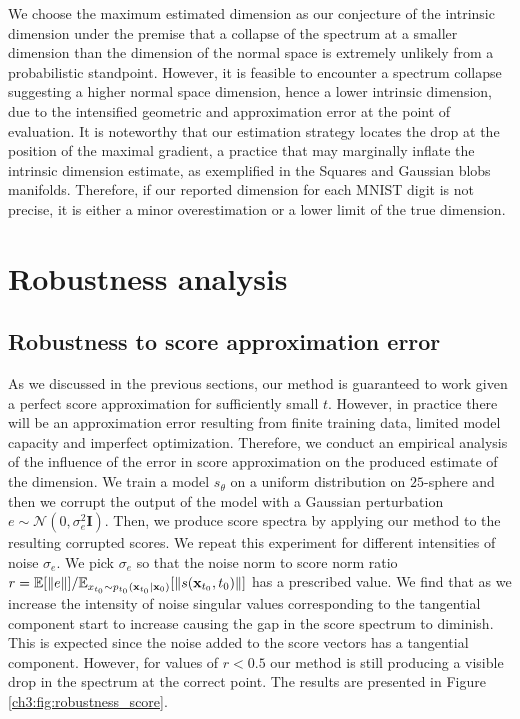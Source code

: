    We choose the maximum estimated dimension as our conjecture of the intrinsic dimension under the premise that a collapse of the spectrum at a smaller dimension than the dimension of the normal space is extremely unlikely from a probabilistic standpoint.  However, it is feasible to encounter a spectrum collapse suggesting a higher normal space dimension, hence a lower intrinsic dimension, due to the intensified geometric and approximation error at the point of evaluation. It is noteworthy that our estimation strategy locates the drop at the position of the maximal gradient, a practice that may marginally inflate the intrinsic dimension estimate, as exemplified in the Squares and Gaussian blobs manifolds. Therefore, if our reported dimension for each MNIST digit is not precise, it is either a minor overestimation or a lower limit of the true dimension.
   
\section{Robustness analysis}
   \label{ch3:appendix:robust}
   \subsection{Robustness to score approximation error}
   As we discussed in the previous sections, our method is guaranteed to work given a perfect score approximation for sufficiently small $t$. However, in practice there will be an approximation error resulting from finite training data, limited model capacity and imperfect optimization. Therefore, we conduct an empirical analysis of the influence of the error in score approximation on the produced estimate of the dimension. We train a model $s_\theta$ on a uniform distribution on $25$-sphere and then we corrupt the output of the model with a Gaussian perturbation $e \sim \mathcal{N}(0, \sigma^2_e\textbf{I})$. Then, we produce score spectra by applying our method to the resulting corrupted scores. We repeat this experiment for different intensities of noise $\sigma_e$. We pick $\sigma_e$ so that the noise norm to score norm ratio $r = \mathbb{E}[\left\lVert e \right\rVert] / \mathbb{E}_{x_{t_0} \sim p_{t_0}(\textbf{x}_{t_0} | \textbf{x}_0)}[\left\lVert s(\textbf{x}_{t_0} , t_0) \right\rVert]$ has a prescribed value. We find that as we increase the intensity of noise singular values corresponding to the tangential component start to increase causing the gap in the score spectrum  to diminish. This is expected since the noise added to the score vectors has a tangential component.  However, for values of $r < 0.5$ our method is still producing a visible drop in the spectrum at the correct point. The results are presented in Figure \ref{ch3:fig:robustness_score}.
   
